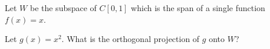 Let $W$ be the subspace of $C[0,1]$ which is the span of a single function 
$f(x) = x$.  

Let $g(x) = x^2$.  What is the orthogonal projection of $g$ onto $W$?  


\\


\edXsolution{ 
}

\endedxproblem


\endedxvertical







\endedxvertical


